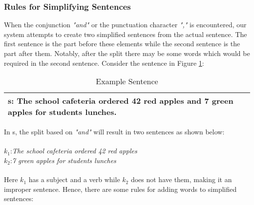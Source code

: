 \documentclass[11pt]{article}
\begin{document}
\subsubsection{Rules for Simplifying Sentences}\label{sec:SimplificationRules}
When the conjunction \textit{"and"} or  the punctuation character \textit{","} is encountered, our system attempts to create two simplified sentences from the actual sentence. The first sentence is the part before these elements while the second sentence is the part after them. Notably, after the split there may be some words which would be required in the second sentence. Consider the sentence in Figure \ref{figure:2}: 
\vspace{-0.7cm}
\begin{table}[H]
\centering
\begin{tabular}{ | m{7cm} | }
\hline
$\mathbf{s}$: The school cafeteria ordered 42 red apples and 7 green apples for students lunches.\\
\hline
\end{tabular}
\caption{\small Example Sentence}
\label{figure:2}
\end{table}

In s, the split based on \textit{"and"} will result in two sentences as shown below:
\\
\\
$\mathit{k_{1}}$:\textit{The school cafeteria ordered 42 red apples}\\
$\mathit{k_{2}}$:\textit{7 green apples for students lunches}
\\
\\
Here $\mathit{k_{1}}$ has a subject and a verb while $\mathit{k_{2}}$ does not have them, making it an improper sentence. Hence, there are some rules for adding words to simplified sentences:
\end{document}
